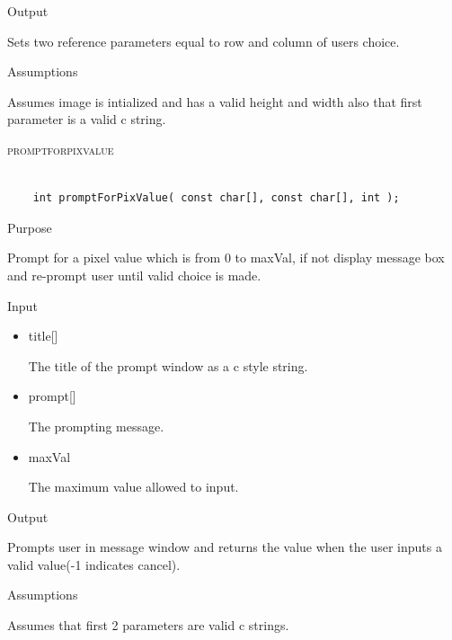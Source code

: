 \documentclass[pdftex, 11pt]{article}
\begin{document}
\begin{description}
\begin{description}
			\item{Output}

				Sets two reference parameters equal to row and column of
				users choice.

			\item{Assumptions}

				Assumes image is intialized and has a valid height and width
				also that first parameter is a valid c string.

		\end{description}



	\item{\textsc{promptforpixvalue}}

		\begin{lstlisting}

	int promptForPixValue( const char[], const char[], int );
		\end{lstlisting}

		\begin{description}
			\item{Purpose}

				Prompt for a pixel value which is from 0 to maxVal, if not display message
				box and re-prompt user until valid choice is made.

			\item{Input}

				\begin{itemize}
					
					\item{title[]}

						The title of the prompt window as a c style string.

					\item{prompt[]}

						The prompting message.

					\item{maxVal}

						The maximum value allowed to input.

				\end{itemize}

			\item{Output}

				Prompts user in message window and returns the value when
				the user inputs a valid value(-1 indicates cancel).

			\item{Assumptions}

				Assumes that first 2 parameters are valid c strings.


\end{description}
\end{description}
\end{document}

